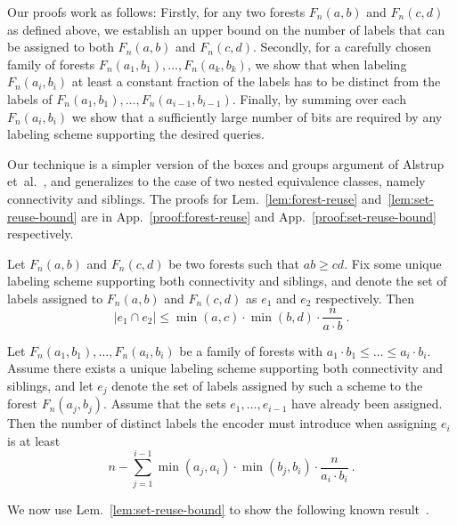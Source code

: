 \documentclass{llncs}
\begin{document}
Our proofs work as follows:
Firstly, for any two forests $F_n(a,b)$ and $F_n(c,d)$ as defined above, we
        establish an upper bound on the number of labels that can be assigned
        to both $F_n(a,b)$ and $F_n(c,d)$.
Secondly, for a carefully chosen family of forests $F_n(a_1,b_1), \ldots,
        F_n(a_k,b_k)$, we  show that when labeling $F_n(a_i,b_i)$ at least
        a constant fraction of the labels has to be distinct from the labels of
        $F_n(a_1,b_1),\ldots, F_n(a_{i-1},b_{i-1})$.
Finally,  by summing over each $F_n(a_i, b_i)$ we show that a sufficiently
        large number of bits are required by any labeling scheme supporting the
        desired queries.
        
Our technique is a simpler version of the boxes and groups argument of Alstrup et~al.~\cite{Alstrup05}, and generalizes to the case of two nested equivalence classes, namely connectivity and siblings. The proofs for Lem.~\ref{lem:forest-reuse} and~\ref{lem:set-reuse-bound} are in 
App.~\ref{proof:forest-reuse} and App.~\ref{proof:set-reuse-bound} respectively.

\begin{lemma}\label{lem:forest-reuse}
    Let $F_n(a,b)$ and $F_n(c,d)$ be two forests such that $ab \ge cd$.
    Fix some unique labeling scheme supporting both
    connectivity and siblings, and denote the set of labels assigned to
    $F_n(a,b)$ and $F_n(c,d)$ as $e_1$ and $e_2$ respectively.
	Then
    \[
        |e_1\cap e_2| \le \min(a,c)\cdot\min(b,d)\cdot\frac{n}{a\cdot b}\ .
    \]
\end{lemma}


\begin{lemma}\label{lem:set-reuse-bound}
    Let $F_n(a_1,b_1),\ldots, F_n(a_i,b_i)$ be a family of forests with
    $a_1\cdot b_1\le \ldots\le a_i\cdot b_i$. Assume there exists a unique
    labeling scheme supporting both connectivity and siblings, and let $e_j$
    denote the set of labels assigned by such a scheme to the forest
    $F_n(a_j,b_j)$. Assume that the sets $e_1,\ldots,e_{i-1}$ have already
    been assigned. Then the number of distinct labels the encoder must
    introduce when assigning $e_i$ is at least
    \[
        n - \sum_{j=1}^{i-1} \min(a_j,a_i)\cdot \min(b_j,b_i)\cdot
        \frac{n}{a_i\cdot b_i}\ .
    \]
\end{lemma}

We now use Lem.~\ref{lem:set-reuse-bound} to show the following
known result~\cite{Alstrup05}.
\end{document}
